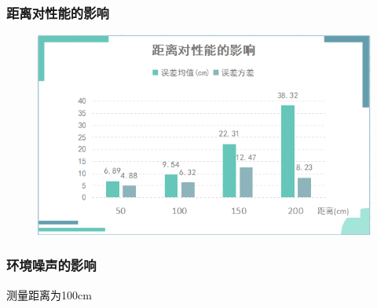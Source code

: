 \subsubsection{距离对性能的影响}

\begin{figure}[h!]
    \centering
    \includegraphics[width=0.6\linewidth]{1.png}
\end{figure}

\subsubsection{环境噪声的影响}

测量距离为100cm

